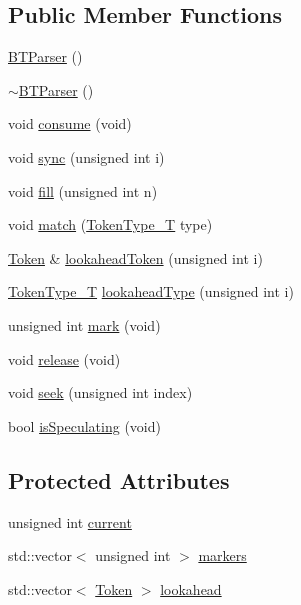 \subsection*{Public Member Functions}
\begin{DoxyCompactItemize}
\item 
\hyperlink{class_b_t_parser_ad9495eabeaf69d91c5f26131cabd3ec4}{BTParser} ()
\item 
\hyperlink{class_b_t_parser_a5965c4cf0baf950be976a0a2932eec2c}{$\sim$BTParser} ()
\item 
void \hyperlink{class_b_t_parser_a9d72bba86b16427b0b03e91113b0f027}{consume} (void)
\item 
void \hyperlink{class_b_t_parser_a762e16322aec6e50af51c2b6377d86fe}{sync} (unsigned int i)
\item 
void \hyperlink{class_b_t_parser_a366b4477388d2cd7fd655b36342f882c}{fill} (unsigned int n)
\item 
void \hyperlink{class_b_t_parser_ad8fb9348dd9bc2e65a08033dd2539a03}{match} (\hyperlink{token_8h_abf05bcc4c1b09928131e6afd3b768a77}{TokenType\_\-T} type)
\item 
\hyperlink{class_token}{Token} \& \hyperlink{class_b_t_parser_a2674f280bd3000751a100b45ac3899e2}{lookaheadToken} (unsigned int i)
\item 
\hyperlink{token_8h_abf05bcc4c1b09928131e6afd3b768a77}{TokenType\_\-T} \hyperlink{class_b_t_parser_a01abded048ed1573e03867f7f2316583}{lookaheadType} (unsigned int i)
\item 
unsigned int \hyperlink{class_b_t_parser_a9decf824eda1b2c893e170a0e8f736f0}{mark} (void)
\item 
void \hyperlink{class_b_t_parser_a0f7650612e327774ea163488f01efd5c}{release} (void)
\item 
void \hyperlink{class_b_t_parser_af6d31bfc4d025666ea1916ecf48602e2}{seek} (unsigned int index)
\item 
bool \hyperlink{class_b_t_parser_aa000adcfcb26aea600078ad2295eab8f}{isSpeculating} (void)
\end{DoxyCompactItemize}
\subsection*{Protected Attributes}
\begin{DoxyCompactItemize}
\item 
unsigned int \hyperlink{class_b_t_parser_a29930e6537cb65bbefe1962763372165}{current}
\item 
std::vector$<$ unsigned int $>$ \hyperlink{class_b_t_parser_aae8dc94330bb217be99ab2a8f6af005d}{markers}
\item 
std::vector$<$ \hyperlink{class_token}{Token} $>$ \hyperlink{class_b_t_parser_a796693745ebe354914eeacddba20f109}{lookahead}
\end{DoxyCompactItemize}


